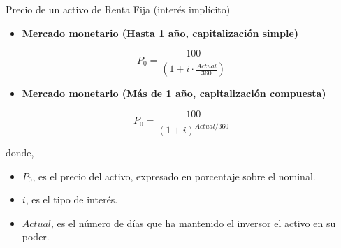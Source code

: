 \documentclass[
  letterpaper,
  DIV=11,
  numbers=noendperiod]{scrartcl}
\providecommand{\tightlist}{%
  \setlength{\itemsep}{0pt}\setlength{\parskip}{0pt}}\usepackage{longtable,booktabs,array}
\begin{document}
\begin{tcolorbox}[enhanced jigsaw, colframe=quarto-callout-note-color-frame, opacityback=0, colback=white, leftrule=.75mm, left=2mm, breakable, arc=.35mm, rightrule=.15mm, toprule=.15mm, bottomrule=.15mm]
\begin{minipage}[t]{5.5mm}
\textcolor{quarto-callout-note-color}{\faInfo}
\end{minipage}%
\begin{minipage}[t]{\textwidth - 5.5mm}

Precio de un activo de Renta Fija (interés implícito)

\begin{itemize}
\tightlist
\item
  \textbf{Mercado monetario (Hasta 1 año, capitalización simple)}
\end{itemize}

\[P_0=\frac{100}{\left(1+i\cdot\frac{Actual}{360}\right)}\]

\begin{itemize}
\tightlist
\item
  \textbf{Mercado monetario (Más de 1 año, capitalización compuesta)}
\end{itemize}

\[P_0=\frac{100}{(1+i)^{Actual/360}}\]

donde,

\begin{itemize}
\item
  \(P_0\), es el precio del activo, expresado en porcentaje sobre el
  nominal.
\item
  \(i\), es el tipo de interés.
\item
  \(Actual\), es el número de días que ha mantenido el inversor el
  activo en su poder.
\end{itemize}

\end{minipage}%
\end{tcolorbox}
\end{document}
